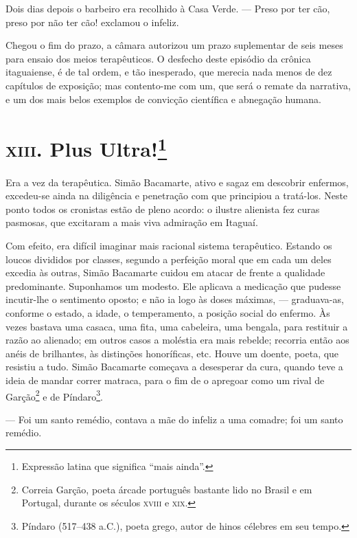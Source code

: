 Dois dias depois o barbeiro era recolhido à Casa Verde. --- Preso por
ter cão, preso por não ter cão! exclamou o infeliz.

Chegou o fim do prazo, a câmara autorizou um prazo suplementar de seis
meses para ensaio dos meios terapêuticos. O desfecho deste episódio da
crônica itaguaiense, é de tal ordem, e tão inesperado, que merecia nada
menos de dez capítulos de exposição; mas contento-me com um, que será o
remate da narrativa, e um dos mais belos exemplos de convicção
científica e abnegação humana.

\chapter{\textsc{xiii}. Plus Ultra!\footnote{Expressão latina que significa ``mais
  ainda''.}}

Era a vez da terapêutica. Simão Bacamarte, ativo e sagaz em descobrir
enfermos, excedeu-se ainda na diligência e penetração com que principiou
a tratá-los. Neste ponto todos os cronistas estão de pleno acordo: o
ilustre alienista fez curas pasmosas, que excitaram a mais viva
admiração em Itaguaí.

Com efeito, era difícil imaginar mais racional sistema terapêutico.
Estando os loucos divididos por classes, segundo a perfeição moral que
em cada um deles excedia às outras, Simão Bacamarte cuidou em atacar de
frente a qualidade predominante. Suponhamos um modesto. Ele aplicava a
medicação que pudesse incutir-lhe o sentimento oposto; e não ia logo às
doses máximas, --- graduava-as, conforme o estado, a idade, o
temperamento, a posição social do enfermo. Às vezes bastava uma casaca,
uma fita, uma cabeleira, uma bengala, para restituir a razão ao
alienado; em outros casos a moléstia era mais rebelde; recorria então
aos anéis de brilhantes, às distinções honoríficas, etc. Houve um
doente, poeta, que resistiu a tudo. Simão Bacamarte começava a
desesperar da cura, quando teve a ideia de mandar correr matraca, para o
fim de o apregoar como um rival de Garção\footnote{Correia Garção, poeta
  árcade português bastante lido no Brasil e em Portugal, durante os
  séculos \textsc{xviii} e \textsc{xix}.} e de Píndaro\footnote{Píndaro (517--438 a.C.),
  poeta grego, autor de hinos célebres em seu tempo.}.

--- Foi um santo remédio, contava a mãe do infeliz a uma comadre; foi um
santo remédio.

